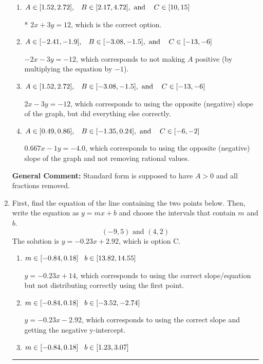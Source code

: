 \documentclass{extbook}[14pt]
\newcommand{\litem}[1]{\item #1

\rule{\textwidth}{0.4pt}}
\begin{document}
\begin{enumerate}
{\begin{enumerate}[label=\Alph*.]
 $0.667x + 1y = 4.0$, which corresponds to not removing rational values for Standard Form.
\item \( A \in [1.52, 2.72], \hspace{3mm} B \in [2.17, 4.72], \text{ and } \hspace{3mm} C \in [10, 15] \)

* $2x + 3y = 12$, which is the correct option.
\item \( A \in [-2.41, -1.9], \hspace{3mm} B \in [-3.08, -1.5], \text{ and } \hspace{3mm} C \in [-13, -6] \)

 $-2x - 3y = -12$, which corresponds to not making $A$ positive (by multiplying the equation by $-1$).
\item \( A \in [1.52, 2.72], \hspace{3mm} B \in [-3.08, -1.5], \text{ and } \hspace{3mm} C \in [-13, -6] \)

 $2x - 3y = -12$, which corresponds to using the opposite (negative) slope of the graph, but did everything else correctly.
\item \( A \in [0.49, 0.86], \hspace{3mm} B \in [-1.35, 0.24], \text{ and } \hspace{3mm} C \in [-6, -2] \)

 $0.667x - 1y = -4.0$, which corresponds to using the opposite (negative) slope of the graph and not removing rational values.
\end{enumerate}

\textbf{General Comment:} Standard form is supposed to have $A > 0$ and all fractions removed.
}
\litem{
First, find the equation of the line containing the two points below. Then, write the equation as $ y=mx+b $ and choose the intervals that contain $m$ and $b$.
\[ (-9, 5) \text{ and } (4, 2) \]
The solution is \( y = -0.23x + 2.92 \), which is option C.\begin{enumerate}[label=\Alph*.]
\item \( m \in [-0.84, 0.18] \hspace*{3mm} b \in [13.82, 14.55] \)

 $y = -0.23x + 14$, which corresponds to using the correct slope/equation but not distributing correctly using the first point.
\item \( m \in [-0.84, 0.18] \hspace*{3mm} b \in [-3.52, -2.74] \)

 $y = -0.23x -2.92$, which corresponds to using the correct slope and getting the negative y-intercept.
\item \( m \in [-0.84, 0.18] \hspace*{3mm} b \in [1.23, 3.07] \)


\end{enumerate}}
\end{enumerate}
\end{document}
